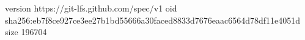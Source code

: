 version https://git-lfs.github.com/spec/v1
oid sha256:eb7f8ce927ce3ee27b1bd55666a30faced8833d7676eaac6564d78df11e4051d
size 196704
